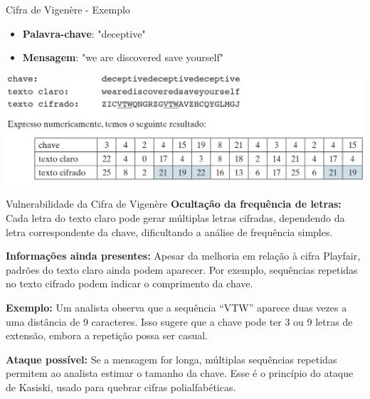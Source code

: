 \begin{frame}{Cifra de Vigenère - Exemplo}
\begin{itemize}
    \item \textbf{Palavra-chave}: "deceptive"
    \item \textbf{Mensagem}: "we are discovered save yourself"
\end{itemize}
\vspace{0.5cm} 
    \centering
    \includegraphics[width=\linewidth]{Figuras/Exemplo-Cifra-de-Vigenere.png}



\end{frame}

\begin{frame}{Vulnerabilidade da Cifra de Vigenère}
\textbf{Ocultação da frequência de letras:}  
Cada letra do texto claro pode gerar múltiplas letras cifradas, dependendo da letra correspondente da chave, dificultando a análise de frequência simples.

\medskip
\textbf{Informações ainda presentes:}  
Apesar da melhoria em relação à cifra Playfair, padrões do texto claro ainda podem aparecer. Por exemplo, sequências repetidas no texto cifrado podem indicar o comprimento da chave.

\medskip
\textbf{Exemplo:}  
Um analista observa que a sequência ``VTW'' aparece duas vezes a uma distância de 9 caracteres.  
Isso sugere que a chave pode ter 3 ou 9 letras de extensão, embora a repetição possa ser casual.

\medskip
\textbf{Ataque possível:}  
Se a mensagem for longa, múltiplas sequências repetidas permitem ao analista estimar o tamanho da chave.  
Esse é o princípio do ataque de Kasiski, usado para quebrar cifras polialfabéticas.
\end{frame}

